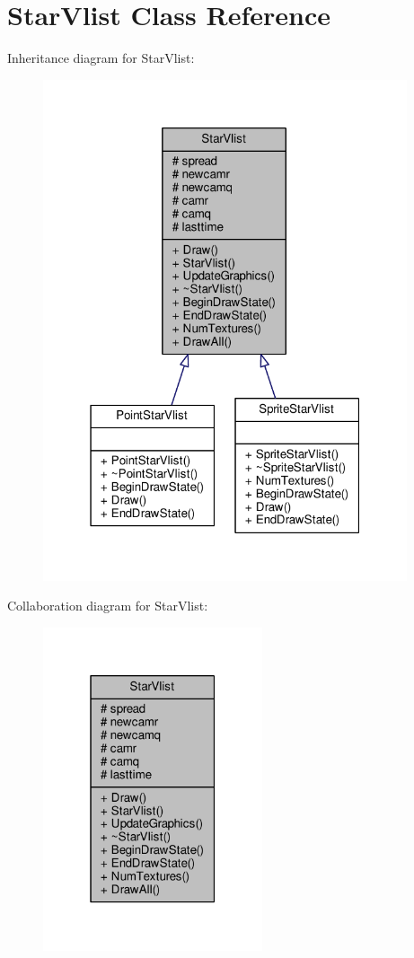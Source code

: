 \hypertarget{classStarVlist}{}\section{Star\+Vlist Class Reference}
\label{classStarVlist}


Inheritance diagram for Star\+Vlist\+:
\nopagebreak
\begin{figure}[H]
\begin{center}
\leavevmode
\includegraphics[width=304pt]{db/d13/classStarVlist__inherit__graph}
\end{center}
\end{figure}


Collaboration diagram for Star\+Vlist\+:
\nopagebreak
\begin{figure}[H]
\begin{center}
\leavevmode
\includegraphics[width=183pt]{d7/d94/classStarVlist__coll__graph}
\end{center}
\end{figure}
